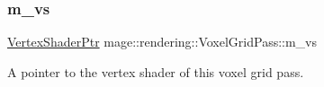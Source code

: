 \subsubsection{\texorpdfstring{m\+\_\+vs}{m\_vs}}
{\footnotesize\ttfamily \hyperlink{namespacemage_1_1rendering_aaf704b9c54a4181f4950a1761de69dda}{Vertex\+Shader\+Ptr} mage\+::rendering\+::\+Voxel\+Grid\+Pass\+::m\+\_\+vs\hspace{0.3cm}{\ttfamily [private]}}

A pointer to the vertex shader of this voxel grid pass. 